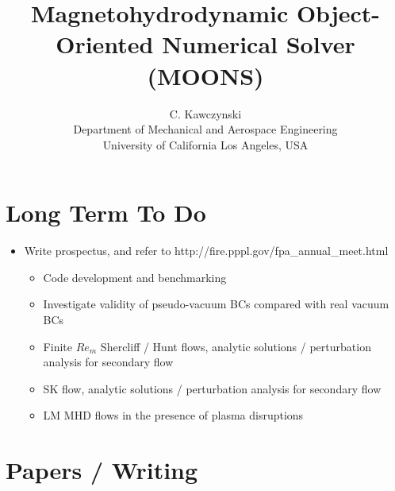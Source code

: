 \documentclass[11pt]{article}
\begin{document}
\doublespacing
\title{Magnetohydrodynamic Object-Oriented Numerical Solver (MOONS)}
\author{C. Kawczynski \\
Department of Mechanical and Aerospace Engineering \\
University of California Los Angeles, USA\\
}
\maketitle

\section{Long Term To Do}

\begin{itemize}
\item Write prospectus, and refer to http://fire.pppl.gov/fpa\_annual\_meet.html
\begin{itemize}
\item Code development and benchmarking
\item Investigate validity of pseudo-vacuum BCs compared with real vacuum BCs
\item Finite $Re_m$ Shercliff / Hunt flows, analytic solutions / perturbation analysis for secondary flow
\item SK flow, analytic solutions / perturbation analysis for secondary flow
\item LM MHD flows in the presence of plasma disruptions
\end{itemize}
\end{itemize}

\newpage

\section{Papers / Writing}
\end{document}

